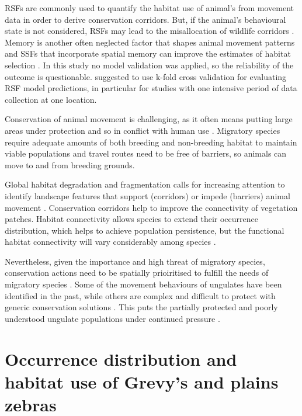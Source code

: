 \documentclass[12pt,a4paper, twoside, english]{article}
\begin{document}
RSFs are commonly used to quantify the habitat use of animal's from movement data in order to derive conservation corridors. But, if the animal's behavioural state is not considered, RSFs may lead to the misallocation of wildlife corridors \citep{Abrahms2016}. Memory is another often neglected factor that shapes animal movement patterns and SSFs that incorporate spatial memory can improve the estimates of habitat selection \citep{Oliveira-Santos2016}. In this study no model validation was applied, so the reliability of the outcome is questionable. \cite{Boyce2002} suggested to use k-fold cross validation for evaluating RSF model predictions, in particular for studies with one intensive period of data collection at one location. 


Conservation of animal movement is challenging, as it often means putting large areas under protection and so in conflict with human use \citep{Thirgood2004}. Migratory species require adequate amounts of both breeding and non-breeding habitat to maintain viable populations and travel routes need to be free of barriers, so animals can move to and from breeding grounds. 

Global habitat degradation and fragmentation calls for increasing attention to identify landscape features that support (corridors) or impede (barriers) animal movement \citep{Panzacchi2016}. Conservation corridors help to improve the connectivity of vegetation patches. Habitat connectivity allows species to extend their occurrence distribution, which helps to achieve population persistence, but the functional habitat connectivity will vary considerably among species \citep{Barton2015}.

Nevertheless, given the importance and high threat of migratory species, conservation actions need to be spatially prioiritised to fulfill the needs of migratory species \citep{Barton2015}. Some of the movement behaviours of ungulates have been identified in the past, while others are complex and difficult to protect with generic conservation solutions \citep{Berger2004, Wilcove2008}. This puts the partially protected and poorly understood ungulate populations under continued pressure \citep{Olson2010}.

\clearpage
\section{Occurrence distribution and habitat use of Grevy's and plains zebras}
\end{document}
